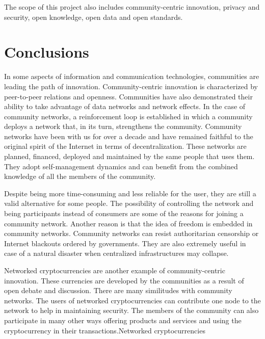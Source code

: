 \documentclass[journal]{IEEEtran}
\begin{document}
The scope of this project also includes community-centric innovation, privacy and security, open knowledge, open data and open standards.

\section{Conclusions}
\label{sec:conclusion}

In some aspects of information and communication technologies, communities are  leading the path of innovation.
Community-centric innovation is characterized by peer-to-peer relations and openness.
Communities have also demonstrated their ability to take advantage of data networks and network effects.
In the case of community networks, a reinforcement loop is established in which a community deploys a network that, in its turn, strengthens the community.
Community networks have been with us for over a decade and have remained faithful to the original spirit of the Internet in terms of decentralization.
These networks are planned, financed, deployed and maintained by the same people that uses them.
They adopt self-management dynamics and can benefit from the combined knowledge of all the members of the community.

Despite being more time-consuming and less reliable for the user, they are still a valid alternative for some people.
The possibility of controlling the network and being participants instead of consumers are some of the reasons for joining a community network.
Another reason is that the idea of freedom is embedded in community networks.
Community networks can resist authoritarian censorship or Internet blackouts ordered by governments.
They are also extremely useful in case of a natural disaster when centralized infrastructures may collapse.

Networked cryptocurrencies are another example of community-centric innovation.
These currencies are developed by the communities as a result of open debate and discussion.
There are many similitudes with community networks.
The users of networked cryptocurrencies can contribute one node to the network to help in maintaining security.
The members of the community can also participate in many other ways offering products and services and using the cryptocurrency in their transactions.Networked cryptocurrencies 
\end{document}
